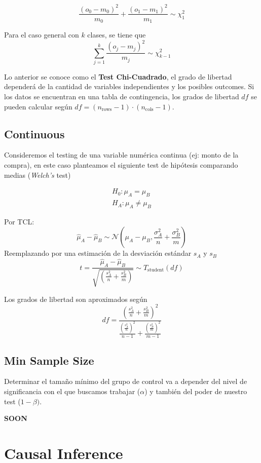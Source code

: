 $$ \frac{(o_0 - m_0)^2}{m_0} + \frac{(o_1 - m_1)^2}{m_1} \sim \chi^2_{1} $$ 

Para el caso general con $k$ clases, se tiene que 
$$ \sum_{j=1}^{k}\frac{(o_j - m_j)^2}{m_j} \sim \chi^2_{k-1}$$ 

Lo anterior se conoce como el \textbf{Test Chi-Cuadrado}, el grado de libertad dependerá de la cantidad de variables independientes y los posibles outcomes. Si los datos se encuentran en una tabla de contingencia, los grados de libertad $df$ se pueden calcular según $df = (n_{\text{rows}} - 1)\cdot (n_{\text{cols}} - 1)$.


\subsection{Continuous}

Consideremos el testing de una variable numérica continua (ej: monto de la compra), en este caso planteamos el siguiente test de hipótesis comparando medias (\textit{Welch's} test)

\begin{equation*}
\begin{aligned}
    H_0: \mu_A = \mu_B \\ 
    H_A: \mu_A \neq \mu_B
\end{aligned}
\end{equation*}

Por TCL: 
$$
\hat{\mu}_A - \hat{\mu}_B \sim \mathcal{N} \left ( \mu_A - \mu_B , \frac{\sigma^2_A}{n} + \frac{\sigma^2_B}{m} \right )
$$
Reemplazando por una estimación de la desviación estándar $s_A$ y $s_B$
$$
t = \frac{\hat{\mu}_A - \hat{\mu}_B}{\sqrt{\left ( \frac{s^2_A}{n} + \frac{s^2_B}{m} \right )}} \sim T_{\text{student}}(df)
$$

Los grados de libertad son aproximados según 
$$
df = \frac{\left ( \frac{s^2_A}{n} + \frac{s^2_B}{m} \right )^2}{ \frac{\left(\frac{s^2_A}{n}\right)^2}{n-1} + \frac{\left(\frac{s^2_B}{m}\right )^2}{m-1}}
$$

\subsection{Min Sample Size}

Determinar el tamaño mínimo del grupo de control va a depender del nivel de significancia con el que buscamos trabajar ($\alpha$) y también del poder de nuestro test ($1-\beta)$. 

\textbf{SOON}

\section{Causal Inference}

